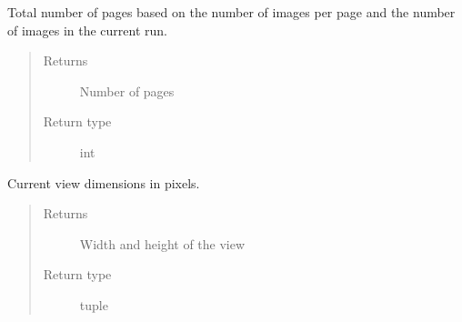 \documentclass[letterpaper,10pt,english]{sphinxmanual}
\begin{document}
\begin{fulllineitems}
\begin{fulllineitems}
\begin{quote}
\begin{description}
\end{description}\end{quote}

\end{fulllineitems}


\begin{fulllineitems}
\label{\detokenize{polo.widgets:polo.widgets.plate_viewer.plateViewer.total_pages}}
Total number of pages based on the number of images per page
and the number of images in the current run.
\begin{quote}\begin{description}
\item[{Returns}] \leavevmode
Number of pages

\item[{Return type}] \leavevmode
int

\end{description}\end{quote}

\end{fulllineitems}


\begin{fulllineitems}
\label{\detokenize{polo.widgets:polo.widgets.plate_viewer.plateViewer.view_dims}}
Current view dimensions in pixels.
\begin{quote}\begin{description}
\item[{Returns}] \leavevmode
Width and height of the view

\item[{Return type}] \leavevmode
tuple

\end{description}\end{quote}

\end{fulllineitems}



\end{fulllineitems}
\end{document}
